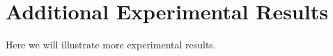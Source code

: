 \section{Additional Experimental Results}\label{appendix_additional_results}
Here we will illustrate more experimental results. 



       
          
